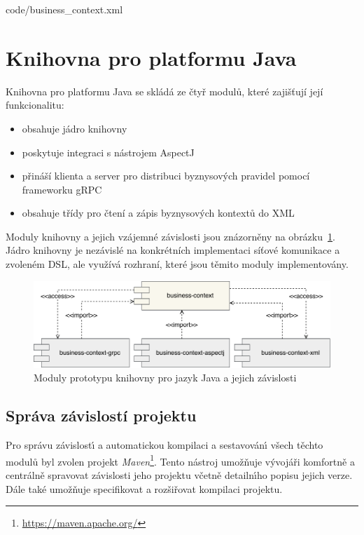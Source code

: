 
{code/business_context.xml}

\section{Knihovna pro platformu Java}

Knihovna pro platformu Java se skládá ze čtyř modulů, které zajišťují
její funkcionalitu:

\begin{itemize}
    \item {} obsahuje jádro knihovny
    \item {} poskytuje integraci s nástrojem AspectJ
    \item {} přináší klienta a server pro distribuci byznysových pravidel pomocí frameworku gRPC
    \item {} obsahuje třídy pro čtení a zápis byznysových kontextů do \gls{XML}
\end{itemize}

Moduly knihovny a jejich vzájemné závislosti jsou znázorněny na obrázku~\ref{fig:modules}.
Jádro knihovny je nezávislé na konkrétních implementaci síťové komunikace a zvoleném
\gls{DSL}, ale využívá rozhraní, které jsou těmito moduly implementovány.

\begin{figure}
    \centering
    \includegraphics[keepaspectratio=true, width=1\linewidth]{figures/library-modules.pdf}
    \caption{Moduly prototypu knihovny pro jazyk Java a jejich závislosti}
    \label{fig:modules}
\end{figure}

\subsection{Správa závislostí projektu}

Pro správu závislost\'{\i} a automatickou kompilaci a sestavován\'{\i}
všech těchto modulů byl zvolen projekt \textit{Maven}\footnote{\url{https://maven.apache.org/}}.
Tento nástroj umožňuje v\'yvojáři komfortně a centrálně spravovat závislosti jeho projektu včetně
detailn\'{\i}ho popisu jejich verze. Dále také umožňuje specifikovat a rozšiřovat kompilaci projektu.

